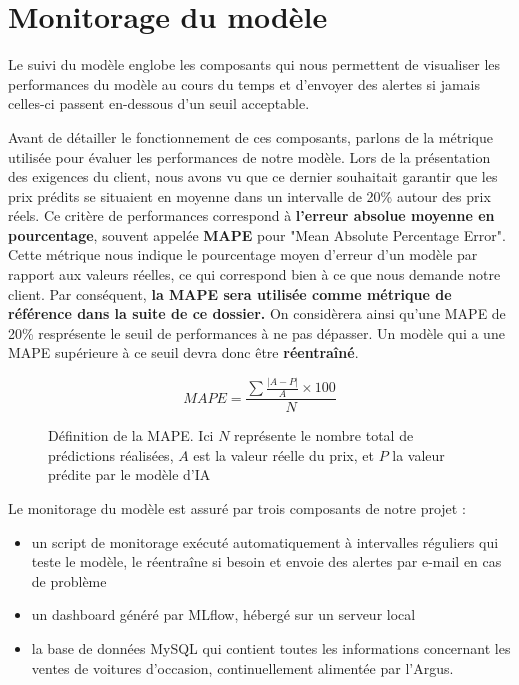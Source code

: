 \documentclass[french]{article}
\begin{document}
    \section{Monitorage du modèle}

    Le suivi du modèle englobe les composants qui nous permettent de visualiser les performances du modèle au cours du temps et d'envoyer des alertes si jamais celles-ci passent en-dessous d'un seuil acceptable. 
    
    Avant de détailler le fonctionnement de ces composants, parlons de la métrique utilisée pour évaluer les performances de notre modèle. Lors de la présentation des exigences du client, nous avons vu que ce dernier souhaitait garantir que les prix prédits se situaient en moyenne dans un intervalle de 20\% autour des prix réels. Ce critère de performances correspond à \textbf{l'erreur absolue moyenne en pourcentage}, souvent appelée \textbf{MAPE} pour "Mean Absolute Percentage Error". Cette métrique nous indique le pourcentage moyen d'erreur d'un modèle par rapport aux valeurs réelles, ce qui correspond bien à ce que nous demande notre client. Par conséquent, \textbf{la MAPE sera utilisée comme métrique de référence dans la suite de ce dossier.} On considèrera ainsi qu'une MAPE de 20\% resprésente le seuil de performances à ne pas dépasser. Un modèle qui a une MAPE supérieure à ce seuil devra donc être \textbf{réentraîné}.

    \begin{figure}[h!]
        \begin{equation}MAPE = \frac {\sum \frac{\lvert A-P \rvert}{A} \times 100}{N}  \end{equation}
        \centering
        \caption{Définition de la MAPE. Ici $N$ représente le nombre total de prédictions réalisées, $A$ est la valeur réelle du prix, et $P$ la valeur prédite par le modèle d'IA}
        \centering
    \end{figure}

    Le monitorage du modèle est assuré par trois composants de notre projet :
    \begin{itemize}
        \item un script de monitorage exécuté automatiquement à intervalles réguliers qui teste le modèle, le réentraîne si besoin et envoie des alertes par e-mail en cas de problème
        \item un dashboard généré par MLflow, hébergé sur un serveur local
        \item la base de données MySQL qui contient toutes les informations concernant les ventes de voitures d'occasion, continuellement alimentée par l'Argus.
    \end{itemize}
\end{document}
